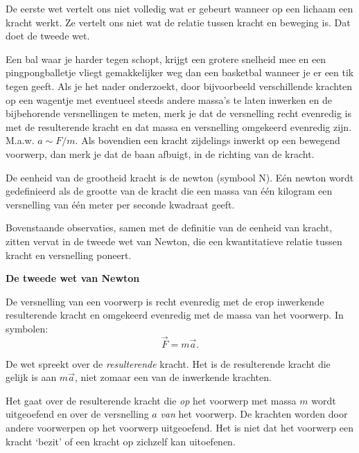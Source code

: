 \documentclass{ximera}
\begin{document}
	\author{Bart Lambregs}
    \xmsource\xmuitleg

De eerste wet vertelt ons niet volledig wat er gebeurt wanneer op een lichaam een kracht werkt. Ze vertelt ons niet wat de relatie tussen kracht en beweging is. Dat doet de tweede wet.

Een bal waar je harder tegen schopt, krijgt een grotere snelheid mee en een pingpongballetje vliegt gemakkelijker weg dan een basketbal wanneer je er een tik tegen geeft. Als je het nader onderzoekt, door bijvoorbeeld verschillende krachten op een wagentje met eventueel steeds andere massa's te laten inwerken en de bijbehorende versnellingen te meten, merk je dat de versnelling recht evenredig is met de resulterende kracht en dat massa en versnelling omgekeerd evenredig zijn. M.a.w. $a\sim F/m$. Als bovendien een kracht zijdelings inwerkt op een bewegend voorwerp, dan merk je dat de baan afbuigt, in de richting van de kracht.

De eenheid van de grootheid kracht is de newton (symbool N). E\'en newton wordt gedefinieerd als de grootte van de kracht die een massa van \'e\'en kilogram een versnelling van \'e\'en meter per seconde kwadraat geeft.

Bovenstaande observaties, samen met de definitie van de eenheid van kracht, zitten vervat in de tweede wet van Newton, die een kwantitatieve relatie tussen kracht en versnelling poneert.

\begin{definition}
{\textbf{De tweede wet van Newton}} \nl

De versnelling van een voorwerp is recht evenredig met de erop inwerkende resulterende kracht en omgekeerd evenredig met de massa van het voorwerp. In symbolen:
\begin{equation*}
\vec{F}=m\vec{a}.
\end{equation*}
\end{definition}

\begin{remark}{De wet spreekt over de \emph{resulterende} kracht.} Het is de resulterende kracht die gelijk is aan $m\vec{a}$, niet zomaar een van de inwerkende krachten.
\end{remark}

\begin{remark}{Het gaat over de resulterende kracht die \emph{op} het voorwerp met massa $m$ wordt uitgeoefend en over de versnelling $a$ \emph{van} het voorwerp.} De krachten worden door andere voorwerpen op het voorwerp uitgeoefend. Het is niet dat het voorwerp een kracht `bezit' of een kracht op zichzelf kan uitoefenen.
	
\end{remark}
\end{document}
